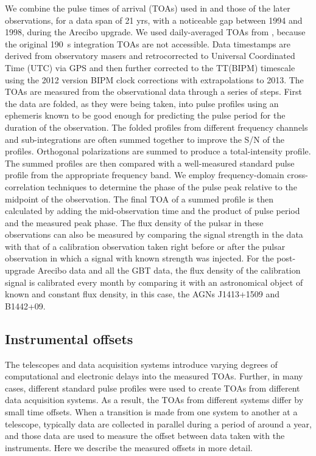 We combine the pulse times of arrival (TOAs) used in \citealt{sns+05} and those
of the later observations, for a data span of 21 yrs, with a
noticeable gap between 1994 and 1998, during the Arecibo upgrade.
We used daily-averaged TOAs from \citealt{sns+05}, because the original 190~s integration TOAs are not accessible.
Data timestamps are derived from observatory masers and retrocorrected
to Universal Coordinated Time (UTC) via GPS and then further
corrected to the TT(BIPM) timescale using the 2012 version BIPM clock corrections with extrapolations to 2013.
The TOAs are measured from the observational data through a series of
steps. First the data are folded, as they were being taken, into pulse
profiles using an ephemeris known to be good enough for predicting the
pulse period for the duration of the observation. The folded
profiles from different frequency channels and sub-integrations are
often summed together to improve the S/N of the profiles.  Orthogonal
polarizations are summed to produce a total-intensity profile.
The summed profiles are then compared with a well-measured standard
pulse profile from the appropriate frequency band. We employ
frequency-domain cross-correlation techniques \citep{tay92} to determine the phase of the pulse peak relative to the midpoint of the observation. The final TOA of a summed profile is then calculated by adding the mid-observation time and the product of pulse period and the measured peak phase.
The flux density of the pulsar in these observations can also be
measured by comparing the signal strength in the data with that of a
calibration observation taken right before or after the pulsar
observation in which a signal with known strength was injected. For
the post-upgrade Arecibo data and all the GBT data, the
flux density of the calibration signal is calibrated every month by
comparing it with an astronomical object of known and constant flux
density, in this case, the AGNs J1413+1509 and B1442+09.

\subsection{Instrumental offsets}
The telescopes and data acquisition systems introduce varying degrees of
computational and electronic delays into the measured TOAs.   Further, in many
cases, different standard pulse profiles were used to create TOAs from
different data acquisition systems.  As a result, the TOAs from different
systems differ by small time offsets.  When a transition is made from one
system to another at a telescope, typically data are collected in parallel
during a period of around a year, and those data are used to measure the
offset between data taken with the instruments.  Here we describe the measured
offsets in more detail.

